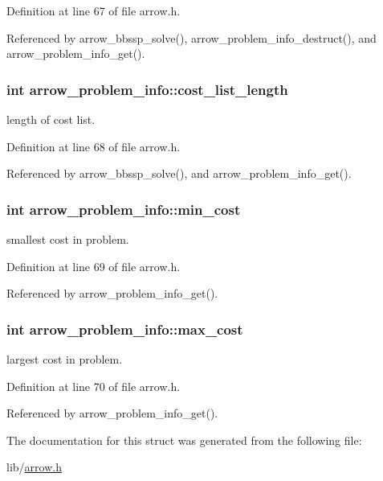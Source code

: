 Definition at line 67 of file arrow.h.

Referenced by arrow\_\-bbssp\_\-solve(), arrow\_\-problem\_\-info\_\-destruct(), and arrow\_\-problem\_\-info\_\-get().\hypertarget{structarrow__problem__info_54bbdc187af19361072480b45016f171}{
\subsubsection{\setlength{\rightskip}{0pt plus 5cm}int {\bf arrow\_\-problem\_\-info::cost\_\-list\_\-length}}}
\label{structarrow__problem__info_54bbdc187af19361072480b45016f171}


length of cost list. 

Definition at line 68 of file arrow.h.

Referenced by arrow\_\-bbssp\_\-solve(), and arrow\_\-problem\_\-info\_\-get().\hypertarget{structarrow__problem__info_46fabcc0ccd3a732cebb014331d4eeb5}{
\subsubsection{\setlength{\rightskip}{0pt plus 5cm}int {\bf arrow\_\-problem\_\-info::min\_\-cost}}}
\label{structarrow__problem__info_46fabcc0ccd3a732cebb014331d4eeb5}


smallest cost in problem. 

Definition at line 69 of file arrow.h.

Referenced by arrow\_\-problem\_\-info\_\-get().\hypertarget{structarrow__problem__info_724060f3be25521cca761899913c2776}{
\subsubsection{\setlength{\rightskip}{0pt plus 5cm}int {\bf arrow\_\-problem\_\-info::max\_\-cost}}}
\label{structarrow__problem__info_724060f3be25521cca761899913c2776}


largest cost in problem. 

Definition at line 70 of file arrow.h.

Referenced by arrow\_\-problem\_\-info\_\-get().

The documentation for this struct was generated from the following file:\begin{CompactItemize}
\item 
lib/\hyperlink{arrow_8h}{arrow.h}\end{CompactItemize}
